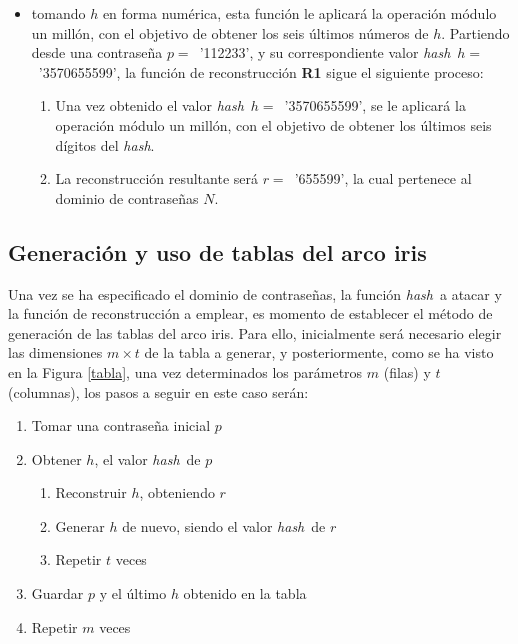 \documentclass[12pt,spanish,listoffigures,listoftables]{tfgetsinf}
\newcommand{\hash}{\textit{hash}}
\begin{document}
\begin{itemize}

	\item tomando $h$ en forma numérica, esta función le aplicará la operación módulo un millón, con el objetivo de obtener los seis últimos números de $h$. Partiendo desde una contraseña $p = $~'112233', y su correspondiente valor \hash~$h = $~'3570655599', la función de reconstrucción \textbf{R1} sigue el siguiente proceso:

		\begin{enumerate}

			\item Una vez obtenido el valor \hash~$h = $~'3570655599', se le aplicará la operación módulo un millón, con el objetivo de obtener los últimos seis dígitos del \hash.

			\item La reconstrucción resultante será $r = $~'655599', la cual pertenece al dominio de contraseñas $N$.

		\end{enumerate}

\end{itemize}

\subsection{Generación y uso de tablas del arco iris}

Una vez se ha especificado el dominio de contraseñas, la función \hash~a atacar y la función de reconstrucción a emplear, es momento de establecer el método de generación de las tablas del arco iris. Para ello, inicialmente será necesario elegir las dimensiones $m \times t$ de la tabla a generar, y posteriormente, como se ha visto en la Figura \ref{tabla}, una vez determinados los parámetros $m$ (filas) y $t$ (columnas), los pasos a seguir en este caso serán:

\begin{enumerate}[label*=\arabic*.]

    \item Tomar una contraseña inicial $p$
    
    \item Obtener $h$, el valor \hash~de $p$
    
    \begin{enumerate}[label*=\arabic*.]
    
        \item Reconstruir $h$, obteniendo $r$
        
        \item Generar $h$ de nuevo, siendo el valor \hash~de $r$
        
        \item Repetir $t$ veces
        
    \end{enumerate}
    
    \item Guardar $p$ y el último $h$ obtenido en la tabla
    
    \item Repetir $m$ veces
    
\end{enumerate}
\end{document}
